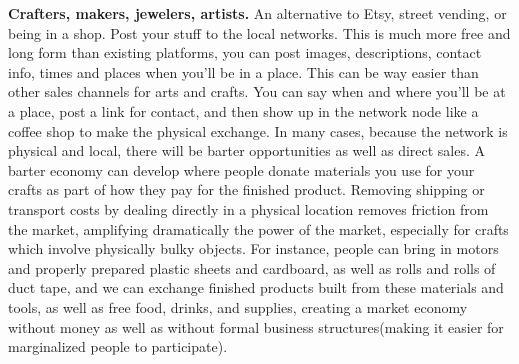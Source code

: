\textbf{Crafters, makers, jewelers, artists.}  An alternative to Etsy, street vending, or being in a shop.  Post your stuff to the local networks.  This is much more free and long form than existing platforms, you can post images, descriptions, contact info, times and places when you'll be in a place.  This can be way easier than other sales channels for arts and crafts.  You can say when and where you'll be at a place, post a link for contact, and then show up in the network node like a coffee shop to make the physical exchange.  In many cases, because the network is physical and local, there will be barter opportunities as well as direct sales.  A barter economy can develop where people donate materials you use for your crafts as part of how they pay for the finished product.  Removing shipping or transport costs by dealing directly in a physical location removes friction from the market, amplifying dramatically the power of the market, especially for crafts which involve physically bulky objects.  For instance, people can bring in motors and properly prepared plastic sheets and cardboard, as well as rolls and rolls of duct tape, and we can exchange finished products built from these materials and tools, as well as free food, drinks, and supplies, creating a market economy without money as well as without formal business structures(making it easier for marginalized people to participate).

